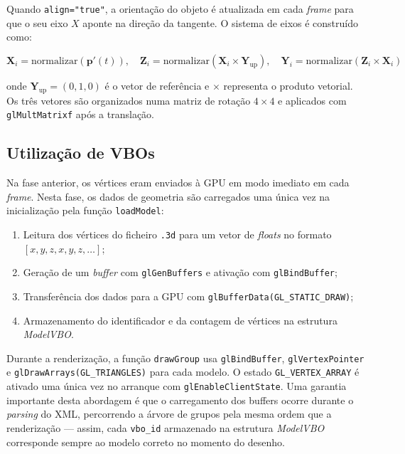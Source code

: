 \documentclass[12pt,a4paper]{article}
\begin{document}
Quando \texttt{align="true"}, a orientação do objeto é atualizada em cada \textit{frame} para que o seu eixo $X$ aponte na direção da tangente. O sistema de eixos é construído como:

\begin{equation}
    \mathbf{X}_i = \text{normalizar}\!\left(\mathbf{p}'(t)\right), \quad
    \mathbf{Z}_i = \text{normalizar}\!\left(\mathbf{X}_i \times \mathbf{Y}_{\text{up}}\right), \quad
    \mathbf{Y}_i = \text{normalizar}\!\left(\mathbf{Z}_i \times \mathbf{X}_i\right)
\end{equation}

onde $\mathbf{Y}_{\text{up}} = (0, 1, 0)$ é o vetor de referência e $\times$ representa o produto vetorial. Os três vetores são organizados numa matriz de rotação $4 \times 4$ e aplicados com \texttt{glMultMatrixf} após a translação.

\subsection{Utilização de VBOs}

Na fase anterior, os vértices eram enviados à GPU em modo imediato em cada \textit{frame}. Nesta fase, os dados de geometria são carregados uma única vez na inicialização pela função \texttt{loadModel}:

\begin{enumerate}
    \item Leitura dos vértices do ficheiro \texttt{.3d} para um vetor de \textit{floats} no formato $[x, y, z, x, y, z, \ldots]$;
    \item Geração de um \textit{buffer} com \texttt{glGenBuffers} e ativação com \texttt{glBindBuffer};
    \item Transferência dos dados para a GPU com \texttt{glBufferData(GL\_STATIC\_DRAW)};
    \item Armazenamento do identificador e da contagem de vértices na estrutura \textit{ModelVBO}.
\end{enumerate}

Durante a renderização, a função \texttt{drawGroup} usa \texttt{glBindBuffer}, \texttt{glVertexPointer} e \texttt{glDrawArrays(GL\_TRIANGLES)} para cada modelo. O estado \texttt{GL\_VERTEX\_ARRAY} é ativado uma única vez no arranque com \texttt{glEnableClientState}. Uma garantia importante desta abordagem é que o carregamento dos buffers ocorre durante o \textit{parsing} do XML, percorrendo a árvore de grupos pela mesma ordem que a renderização — assim, cada \texttt{vbo\_id} armazenado na estrutura \textit{ModelVBO} corresponde sempre ao modelo correto no momento do desenho.
\end{document}
